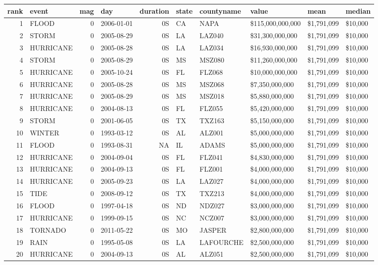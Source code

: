 \documentclass[]{article}
\newenvironment{Shaded}{\begin{snugshade}}{\end{snugshade}}
\newcommand{\DecValTok}[1]{\textcolor[rgb]{0.00,0.00,0.81}{{#1}}}
\newcommand{\StringTok}[1]{\textcolor[rgb]{0.31,0.60,0.02}{{#1}}}
\newcommand{\CommentTok}[1]{\textcolor[rgb]{0.56,0.35,0.01}{\textit{{#1}}}}
\newcommand{\NormalTok}[1]{{#1}}
\begin{document}
\begin{longtable}[]{@{}rlrlrlllll@{}}
\toprule
rank & event & mag & day & duration & state & countyname & value & mean
& median\tabularnewline
\midrule
\endhead
1 & FLOOD & 0 & 2006-01-01 & 0S & CA & NAPA & \$115,000,000,000 &
\$1,791,099 & \$10,000\tabularnewline
2 & STORM & 0 & 2005-08-29 & 0S & LA & LAZ040 & \$31,300,000,000 &
\$1,791,099 & \$10,000\tabularnewline
3 & HURRICANE & 0 & 2005-08-28 & 0S & LA & LAZ034 & \$16,930,000,000 &
\$1,791,099 & \$10,000\tabularnewline
4 & STORM & 0 & 2005-08-29 & 0S & MS & MSZ080 & \$11,260,000,000 &
\$1,791,099 & \$10,000\tabularnewline
5 & HURRICANE & 0 & 2005-10-24 & 0S & FL & FLZ068 & \$10,000,000,000 &
\$1,791,099 & \$10,000\tabularnewline
6 & HURRICANE & 0 & 2005-08-28 & 0S & MS & MSZ068 & \$7,350,000,000 &
\$1,791,099 & \$10,000\tabularnewline
7 & HURRICANE & 0 & 2005-08-29 & 0S & MS & MSZ018 & \$5,880,000,000 &
\$1,791,099 & \$10,000\tabularnewline
8 & HURRICANE & 0 & 2004-08-13 & 0S & FL & FLZ055 & \$5,420,000,000 &
\$1,791,099 & \$10,000\tabularnewline
9 & STORM & 0 & 2001-06-05 & 0S & TX & TXZ163 & \$5,150,000,000 &
\$1,791,099 & \$10,000\tabularnewline
10 & WINTER & 0 & 1993-03-12 & 0S & AL & ALZ001 & \$5,000,000,000 &
\$1,791,099 & \$10,000\tabularnewline
11 & FLOOD & 0 & 1993-08-31 & NA & IL & ADAMS & \$5,000,000,000 &
\$1,791,099 & \$10,000\tabularnewline
12 & HURRICANE & 0 & 2004-09-04 & 0S & FL & FLZ041 & \$4,830,000,000 &
\$1,791,099 & \$10,000\tabularnewline
13 & HURRICANE & 0 & 2004-09-13 & 0S & FL & FLZ001 & \$4,000,000,000 &
\$1,791,099 & \$10,000\tabularnewline
14 & HURRICANE & 0 & 2005-09-23 & 0S & LA & LAZ027 & \$4,000,000,000 &
\$1,791,099 & \$10,000\tabularnewline
15 & TIDE & 0 & 2008-09-12 & 0S & TX & TXZ213 & \$4,000,000,000 &
\$1,791,099 & \$10,000\tabularnewline
16 & FLOOD & 0 & 1997-04-18 & 0S & ND & NDZ027 & \$3,000,000,000 &
\$1,791,099 & \$10,000\tabularnewline
17 & HURRICANE & 0 & 1999-09-15 & 0S & NC & NCZ007 & \$3,000,000,000 &
\$1,791,099 & \$10,000\tabularnewline
18 & TORNADO & 0 & 2011-05-22 & 0S & MO & JASPER & \$2,800,000,000 &
\$1,791,099 & \$10,000\tabularnewline
19 & RAIN & 0 & 1995-05-08 & 0S & LA & LAFOURCHE & \$2,500,000,000 &
\$1,791,099 & \$10,000\tabularnewline
20 & HURRICANE & 0 & 2004-09-13 & 0S & AL & ALZ051 & \$2,500,000,000 &
\$1,791,099 & \$10,000\tabularnewline
\bottomrule
\end{longtable}

\begin{Shaded}
\end{Shaded}
\end{document}

